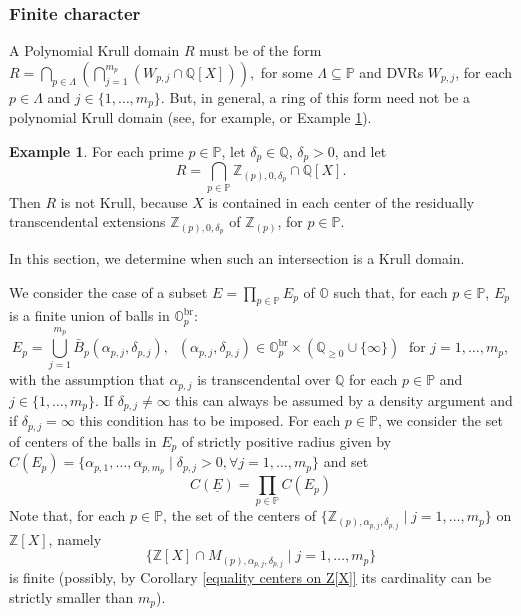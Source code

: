 \documentclass[10pt]{article}
\numberwithin{equation}{section}
\theoremstyle{definition}
\newtheorem{Ex}[equation]{Example}
\theoremstyle{definition}
\newcommand{\Q}{\mathbb{Q}}
\newcommand{\Z}{\mathbb{Z}}
\renewcommand{\O}{\mathbb{O}}
\newcommand{\PP}{\mathbb{P}}
\newcommand{\uE}{\underline{E}}
\newcommand{\br}{\text{br}}
\begin{document}
\subsubsection{Finite character}

A Polynomial Krull domain $R$ must be of the form $R = \bigcap\limits_{p \in \Lambda}(\bigcap\limits_{j=1}^{m_p}(W_{p,j} \cap \Q[X])),$ for some $\Lambda\subseteq\PP$ and DVRs $W_{p,j}$, for each $p\in\Lambda$ and $j\in\{1,\ldots,m_p\}$. But, in general, a ring of this form need not be a polynomial Krull domain (see, for example, \cite[Theorem 3.5]{Chang}
or Example \ref{ex430}). 

\begin{Ex} \label{ex430}
For each prime $p \in \PP$, let $\delta_p\in\Q$, $\delta_p>0$, and let
$$R = \bigcap_{p\in\PP}\Z_{(p),0,\delta_p}\cap\Q[X].$$
Then $R$ is not Krull, because $X$ is contained in each center of
the residually transcendental extensions $\Z_{(p),0,\delta_p}$ of $\Z_{(p)}$, for $p\in\PP$.
\end{Ex}

\noindent
In this section, we determine when such an intersection  is a Krull domain.


We consider the case of a subset $E=\prod\limits_{p\in\PP}E_p$ of $\O$ such that, for each $p\in\PP$, $E_p$ is a finite union of balls in $\O_p^{\br}$:
$$E_p=\bigcup_{j=1}^{m_p}\bar B_p(\alpha_{p,j},\delta_{p,j}),\;\;(\alpha_{p,j},\delta_{p,j})\in\O_p^{\br}\times(\Q_{\geq0}\cup\{\infty\}) \;\text{ for } j=1,\ldots,m_p,$$
with the assumption that $\alpha_{p,j}$ is transcendental over $\Q$ for each $p\in\PP$ and $j\in\{1,\ldots,m_p\}$. If $\delta_{p,j}\not=\infty$ this can always be assumed by a density argument and if $\delta_{p,j}=\infty$ this condition has to be imposed. For each $p\in\PP$, we consider the set of centers of the balls in $E_p$ of strictly positive radius   given by $C(E_p)=\{\alpha_{p,1},\ldots,\alpha_{p,m_p}\mid \delta_{p,j}>0,\forall j=1,\ldots,m_p\}$ and set
$$C(\uE)=\prod_{p\in\PP}C(E_p)$$
Note that, for each $p\in\PP$, the set of the centers of $\{\Z_{(p),\alpha_{p,j},\delta_{p,j}}\mid j=1,\ldots,m_p\}$ on $\Z[X]$, namely
$$\{\Z[X]\cap M_{(p),\alpha_{p,j},\delta_{p,j}}\mid j=1,\ldots,m_p\}$$
is finite (possibly, by Corollary \ref{equality centers on Z[X]} its cardinality  can be strictly smaller than $m_p$).
\end{document}
